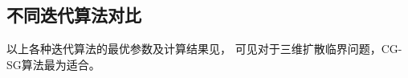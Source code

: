 \begin{comment}
res_gmres_size1_*restart15
1 & 600.929 & 19030 & 19030 \\ %
2 & 600.960 & 26496 & 13248 \\ %
3 & 600.944 & 29478 & 9826 \\ %
4 & 600.944 & 30732 & 7683 \\ %
5-22 & \multicolumn{3}{c}{不收敛} \\ %
23 & 601.194 & 24242 & 1054 \\ %
24 & 601.350 & 24192 & 1008 \\ %
25 & 169.182 & 6700 & 268\\
26 & 160.555 & 6292 & 242\\
27 & 161.804 & 6264 & 232\\
28 & 166.328 & 6412 & 229\\
29 & 175.844 & 6612 & 228\\
30 & 185.750 & 6930 & 231\\
31 & 184.314 & 6944 & 224\\
32 & 185.750 & 7104 & 222\\
33 & 187.013 & 7161 & 217\\
34 & 185.983 & 7242 & 213\\
35 & 192.192 & 7385 & 211\\
36 & 192.255 & 7524 & 209\\
37 & 192.816 & 7622 & 206\\
38 & 197.792 & 7752 & 204\\
39 & 198.604 & 7839 & 201\\
40 & 204.251 & 8000 & 200\\
\end{comment}

\subsection{不同迭代算法对比}

以上各种迭代算法的最优参数及计算结果见，
可见对于三维扩散临界问题，CG-SG算法最为适合。

